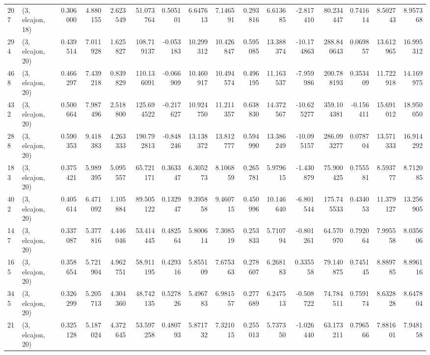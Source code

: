 \begin{tabular}{llrrrrrrrrrrrrrr}
207 &  (3, elcajon, 18) &   0.306000 &   4.880155 &   2.623549 &    51.073764 &   0.505101 &   6.647613 &   7.146591 &  0.293816 &   6.613685 &  -2.817410 &    80.234447 &  0.741614 &   8.502743 &   8.957368 \\
294 &  (3, elcajon, 20) &   0.439514 &   7.011928 &   1.625827 &   108.719137 &  -0.053183 &  10.299312 &  10.426847 &  0.595085 &  13.388374 & -10.174863 &   288.840643 &  0.069857 &  13.612965 &  16.995312 \\
468 &  (3, elcajon, 20) &   0.466297 &   7.439218 &   0.839829 &   110.136091 &  -0.066909 &  10.460917 &  10.494574 &  0.496195 &  11.163537 &  -7.959986 &   200.788193 &  0.353409 &  11.722918 &  14.169975 \\
432 &  (3, elcajon, 20) &   0.500664 &   7.987496 &   2.518800 &   125.694522 &  -0.217627 &  10.924750 &  11.211357 &  0.638830 &  14.372567 & -10.625277 &   359.104381 & -0.156411 &  15.691012 &  18.950050 \\
288 &  (3, elcajon, 20) &   0.590353 &   9.418383 &   4.263333 &   190.792813 &  -0.848246 &  13.138372 &  13.812777 &  0.594990 &  13.386249 & -10.095157 &   286.093277 &  0.078704 &  13.571333 &  16.914292 \\
183 &  (3, elcajon, 20) &   0.375421 &   5.989395 &   5.095557 &    65.721171 &   0.363347 &   6.305273 &   8.106859 &  0.265781 &   5.979615 &  -1.430879 &    75.900425 &  0.755581 &   8.593777 &   8.712085 \\
402 &  (3, elcajon, 20) &   0.405614 &   6.471092 &   1.105884 &    89.505122 &   0.132947 &   9.395858 &   9.460715 &  0.450996 &  10.146640 &  -6.801544 &   175.745533 &  0.434053 &  11.379127 &  13.256905 \\
147 &  (3, elcajon, 20) &   0.337087 &   5.377816 &   4.446046 &    53.414445 &   0.482564 &   5.800614 &   7.308519 &  0.253833 &   5.710794 &  -0.801261 &    64.570970 &  0.792064 &   7.995558 &   8.035606 \\
165 &  (3, elcajon, 20) &   0.358654 &   5.721904 &   4.962751 &    58.911195 &   0.429316 &   5.855109 &   7.675363 &  0.278607 &   6.268183 &   0.335558 &    79.140875 &  0.745145 &   8.889785 &   8.896116 \\
345 &  (3, elcajon, 20) &   0.326299 &   5.205713 &   4.304360 &    48.742135 &   0.527826 &   5.496783 &   6.981557 &  0.277689 &   6.247513 &  -0.508722 &    74.784511 &  0.759174 &   8.632828 &   8.647804 \\
21  &  (3, elcajon, 20) &   0.325128 &   5.187024 &   4.372645 &    53.597258 &   0.480793 &   5.871732 &   7.321015 &  0.255013 &   5.737350 &  -1.026440 &    63.173211 &  0.796566 &   7.881601 &   7.948158 \\

\end{tabular}
